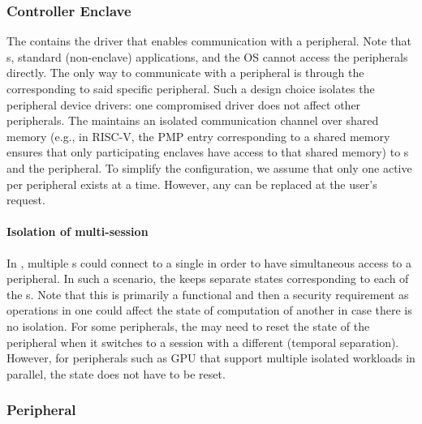\subsubsection{Controller Enclave} 
\label{sec:programmingModel:systemComponents:ce}

The \ce contains the driver that enables communication with a peripheral. Note that \app{}s, standard (non-enclave) applications, and the OS cannot access the peripherals directly. The only way to communicate with a peripheral is through the \ce corresponding to said specific peripheral. Such a design choice isolates the peripheral device drivers: one compromised driver does not affect other peripherals. The \ce maintains an isolated communication channel over shared memory (e.g., in RISC-V, the PMP entry corresponding to a shared memory ensures that only participating enclaves have access to that shared memory) to \app{}s and the peripheral. To simplify the configuration, we assume that only one active \ce per peripheral exists at a time. However, any \ce can be replaced at the user's request. %

\paragraph*{Isolation of multi-\app session} In \name, multiple \app{}s could connect to a single \ce in order to have simultaneous access to a peripheral. In such a scenario, the \ce keeps separate states corresponding to each of the \app{}s. Note that this is primarily a functional and then a security requirement as operations in one \app could affect the state of computation of another \app in case there is no isolation. For some peripherals, the \ce may need to reset the state of the peripheral when it switches to a session with a different \app (temporal separation). However, for peripherals such as GPU that support multiple isolated workloads in parallel, the state does not have to be reset.



\subsubsection{Peripheral} 
\label{sec:programmingModel:systemComponents:peripheral}

